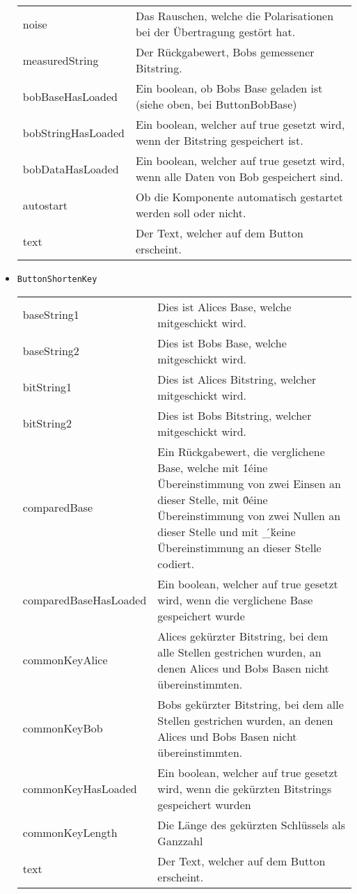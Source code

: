 \begin{itemize}
\begin{tabularx}{\textwidth}{p{3cm}p{11cm}}
noise &  Das Rauschen, welche die Polarisationen bei der Übertragung gestört hat. \\
measuredString &  Der Rückgabewert, Bobs gemessener Bitstring. \\
bobBaseHasLoaded & Ein boolean, ob Bobs Base geladen ist (siehe oben, bei ButtonBobBase) \\
bobStringHasLoaded & Ein boolean, welcher auf true gesetzt wird, wenn der Bitstring gespeichert ist. \\
bobDataHasLoaded &  Ein boolean, welcher auf true gesetzt wird, wenn alle Daten von Bob gespeichert sind. \\
autostart & Ob die Komponente automatisch gestartet werden soll oder nicht. \\
text & Der Text, welcher auf dem Button erscheint.
\end{tabularx}
\item \texttt{ButtonShortenKey} \\
\begin{tabularx}{\textwidth}{p{3cm}p{11cm}} 
baseString1 & Dies ist Alices Base, welche mitgeschickt wird. \\
baseString2 & Dies ist Bobs Base, welche mitgeschickt wird. \\
bitString1 & Dies ist Alices Bitstring, welcher mitgeschickt wird. \\
bitString2 &  Dies ist Bobs Bitstring, welcher mitgeschickt wird. \\
comparedBase & Ein Rückgabewert, die verglichene Base, welche mit \'1\' eine Übereinstimmung von zwei Einsen an dieser Stelle, mit \'0\' eine Übereinstimmung von zwei Nullen an dieser Stelle und mit \'\_\' keine Übereinstimmung an dieser Stelle codiert. \\ 
comparedBaseHasLoaded &  Ein boolean, welcher auf true gesetzt wird, wenn die verglichene Base gespeichert wurde \\
commonKeyAlice &  Alices gekürzter Bitstring, bei dem alle Stellen gestrichen wurden, an denen Alices und Bobs Basen nicht übereinstimmten. \\
commonKeyBob & Bobs gekürzter Bitstring, bei dem alle Stellen gestrichen wurden, an denen Alices und Bobs Basen nicht übereinstimmten. \\
commonKeyHasLoaded &  Ein boolean, welcher auf true gesetzt wird, wenn die gekürzten Bitstrings gespeichert wurden \\
commonKeyLength &  Die Länge des gekürzten Schlüssels als Ganzzahl \\
text &  Der Text, welcher auf dem Button erscheint.

\end{tabularx}
\end{itemize}
